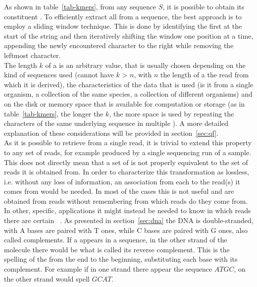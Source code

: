 As shown in table~\ref{tab-kmers}, from any sequence $S$, it is possible to obtain its constituent \kmers. To efficiently extract all \kmers from a sequence, the best approach is to employ a sliding window technique. This is done by identifying the first \kmer at the start of the string and then iteratively shifting the window one position at a time, appending the newly encountered character to the right while removing the leftmost character.\\ The length $k$ of a \kmer is an arbitrary value, that is usually chosen depending on the kind of sequences used (cannot have $k$ > $n$, with $n$ the length of a the read from which it is derived), the characteristics of the data that is used (is it from a single organism, a collection of the same species, a collection of different organisms) and on the disk or memory space that is available for computation or storage (as in table~\ref{tab-kmers}, the longer the $k$, the more space is used by repeating the characters of the same underlying sequence in multiple \kmers). A more detailed explanation of these considerations will be provided in section~\ref{sec:qf}.\\
As it is possible to retrieve \kmers from a single read, it is trivial to extend this property to any set of reads, for example produced by a single sequencing run of a sample. This does not directly mean that a set of \kmers is not properly equivalent to the set of reads it is obtained from. In order to characterize this transformation as lossless, i.e. without any loss of information, an association from each \kmer to the read(s) it comes from would be needed. In most of the cases this is not useful and \kmers are obtained from reads without remembering from which reads do they come from. In other, specific, applications it might instead be needed to know in which reads there are certain \kmers~\cite{back_to_sequences}. %
As presented in section~\ref{sec:dna} the DNA is double-stranded, with A bases are paired with T ones, while C bases are paired with G ones, also called complements. If a \kmer appears in a sequence, in the other strand of the molecule there would be what is called its reverse complement. This is the spelling of the \kmer from the end to the beginning, substituting each base with its complement. For example if in one strand there appear the sequence $ATGC$, on the other strand would spell $GCAT$.\\
